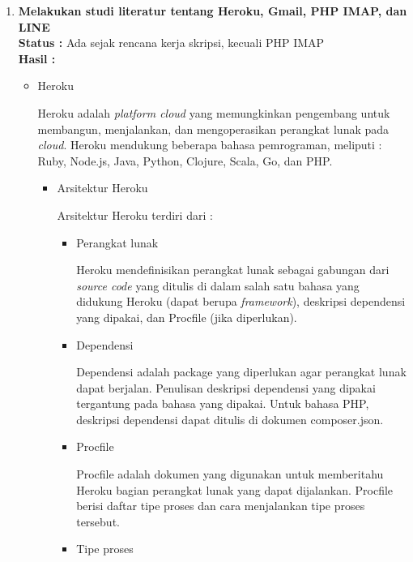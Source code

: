 \documentclass[a4paper,twoside]{article}
\begin{document}
\begin{enumerate}
	\item \textbf{Melakukan studi literatur tentang Heroku, Gmail, PHP IMAP, dan LINE}\\
	{\bf Status :} Ada sejak rencana kerja skripsi, kecuali PHP IMAP\\
	{\bf Hasil :}
	\begin{itemize}
		\item Heroku
		
		Heroku adalah \textit{platform cloud} yang memungkinkan pengembang untuk membangun, menjalankan, dan mengoperasikan perangkat lunak pada \textit{cloud}. Heroku mendukung beberapa bahasa pemrograman, meliputi : Ruby, Node.js, Java, Python, Clojure, Scala, Go, dan PHP.
		\begin{itemize}
			\item Arsitektur Heroku
		
			Arsitektur Heroku terdiri dari :
			\begin{itemize}
				\item Perangkat lunak
				
				Heroku mendefinisikan perangkat lunak sebagai gabungan dari \textit{source code} yang ditulis di dalam salah satu bahasa yang didukung Heroku (dapat berupa \textit{framework}), deskripsi dependensi yang dipakai, dan Procfile (jika diperlukan).
		
				\item Dependensi
		
				Dependensi adalah package yang diperlukan agar perangkat lunak dapat berjalan. Penulisan deskripsi dependensi yang dipakai tergantung pada bahasa yang dipakai. Untuk bahasa PHP, deskripsi dependensi dapat ditulis di dokumen composer.json.
		
				\item Procfile
		
				Procfile adalah dokumen yang digunakan untuk memberitahu Heroku bagian perangkat lunak yang dapat dijalankan. Procfile berisi daftar tipe proses dan cara menjalankan tipe proses tersebut.
		
				\item Tipe proses
		

\end{itemize}
\end{itemize}
\end{itemize}
\end{enumerate}
\end{document}
